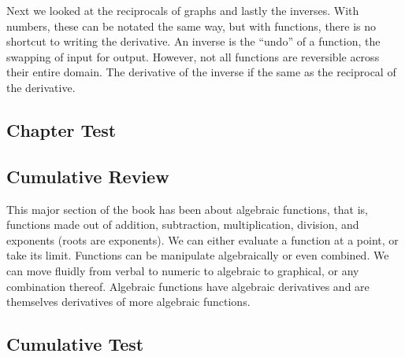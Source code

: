 Next we looked at the reciprocals of graphs and lastly the inverses.  With numbers, these can
be notated the same way, but with functions, there is no shortcut to writing the derivative.
An inverse is the ``undo'' of a function, the swapping of input for output.  However, not all 
functions are reversible across their entire domain.  The derivative of the inverse if the same
as the reciprocal of the derivative.

\subsection{Chapter Test}
\subsection{Cumulative Review} 
This major section of the book has been about algebraic functions, that is, functions made out
of addition, subtraction, multiplication, division, and exponents (roots are exponents).  We 
can either evaluate a function at a point, or take its limit.  Functions can be manipulate
algebraically or even combined.  We can move fluidly from verbal to numeric to algebraic to
graphical, or any combination thereof.  Algebraic functions have algebraic derivatives and are
themselves derivatives of more algebraic functions.
\subsection{Cumulative Test}

